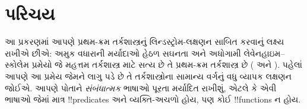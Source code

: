 \documentclass[../../../include/open-logic-section]{subfiles}
\begin{document}
\section{પરિચય}

આ પ્રકરણમાં આપણે પ્રથમ-ક્રમ તર્કશાસ્ત્રનું લિન્ડસ્ટ્રોમ-લક્ષણન સાબિત
કરવાનું લક્ષ્ય રાખીએ છીએ: અમુક વધારાની મર્યાદાઓ હેઠળ સઘનતા અને અધોગામી
લેવેનહાઇમ--સ્કોલેમ પ્રમેયો જે મહત્તમ તર્કશાસ્ત્ર માટે સત્ય છે તે
પ્રથમ-ક્રમ તર્કશાસ્ત્ર છે
( અને
). પહેલાં આપણે આ પ્રમેય જેમને લાગુ
પડે છે તે તર્કશાસ્ત્રોના સામાન્ય વર્ગનું વધુ વ્યાપક લક્ષણન જોઈએ. આપણે
પોતાને \emph{સંબંધાત્મક} ભાષાઓ પૂરતા મર્યાદિત રાખીશું, એટલે કે એવી
ભાષાઓ જેમાં માત્ર !!{predicate}s અને વ્યક્તિ-અચળો હોય, પણ કોઈ
!!{function}s ન હોય.
\end{document}

